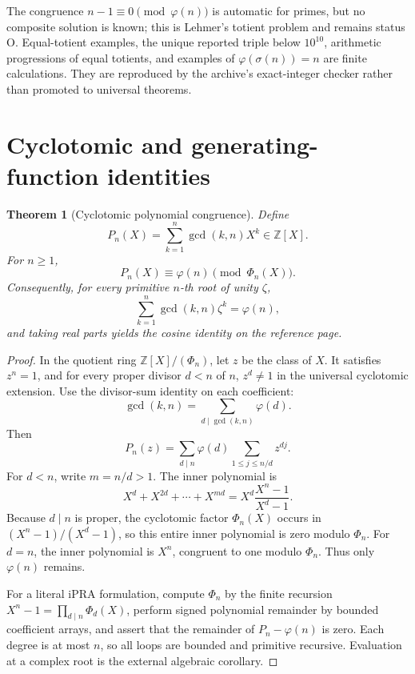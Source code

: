 \documentclass[11pt]{article}
\newtheorem{theorem}{Theorem}[section]
\theoremstyle{definition}
\newcommand{\Z}{\mathbb Z}
\newcommand{\ipra}{\mathrm{iPRA}}
\newcommand{\StatusO}{\textsf{O}}
\begin{document}
The congruence \(n-1\equiv0\pmod{\varphi(n)}\) is automatic for primes, but no
composite solution is known; this is Lehmer's totient problem and remains
status \StatusO.  Equal-totient examples, the unique reported triple below
\(10^{10}\), arithmetic progressions of equal totients, and examples of
\(\varphi(\sigma(n))=n\) are finite calculations.  They are reproduced by the
archive's exact-integer checker rather than promoted to universal theorems.

\section{Cyclotomic and generating-function identities}

\begin{theorem}[Cyclotomic polynomial congruence]\label{thm:cyclotomic-gcd-sum}
Define
\[
 P_n(X)=\sum_{k=1}^{n}\gcd(k,n)X^k\in\Z[X].
\]
For \(n\ge1\),
\[
 \boxed{P_n(X)\equiv\varphi(n)\pmod{\Phi_n(X)}.}
\]
Consequently, for every primitive \(n\)-th root of unity \(\zeta\),
\[
 \sum_{k=1}^{n}\gcd(k,n)\zeta^k=\varphi(n),
\]
and taking real parts yields the cosine identity on the reference page.
\end{theorem}

\begin{proof}
In the quotient ring \(\Z[X]/(\Phi_n)\), let \(z\) be the class of \(X\).
It satisfies \(z^n=1\), and for every proper divisor \(d<n\) of \(n\),
\(z^d\ne1\) in the universal cyclotomic extension.  Use the divisor-sum
identity on each coefficient:
\[
 \gcd(k,n)=\sum_{d\mid\gcd(k,n)}\varphi(d).
\]
Then
\[
 P_n(z)=\sum_{d\mid n}\varphi(d)
          \sum_{1\le j\le n/d}z^{dj}.
\]
For \(d<n\), write \(m=n/d>1\).  The inner polynomial is
\[
 X^d+X^{2d}+\cdots+X^{md}
 =X^d\frac{X^n-1}{X^d-1}.
\]
Because \(d\mid n\) is proper, the cyclotomic factor \(\Phi_n(X)\) occurs in
\((X^n-1)/(X^d-1)\), so this entire inner polynomial is zero modulo
\(\Phi_n\).  For \(d=n\), the inner polynomial is \(X^n\), congruent to one
modulo \(\Phi_n\).  Thus only \(\varphi(n)\) remains.

For a literal \(\ipra\) formulation, compute \(\Phi_n\) by the finite recursion
\(X^n-1=\prod_{d\mid n}\Phi_d(X)\), perform signed polynomial remainder by
bounded coefficient arrays, and assert that the remainder of
\(P_n-\varphi(n)\) is zero.  Each degree is at most \(n\), so all loops are
bounded and primitive recursive.  Evaluation at a complex root is the
external algebraic corollary.
\end{proof}
\end{document}
